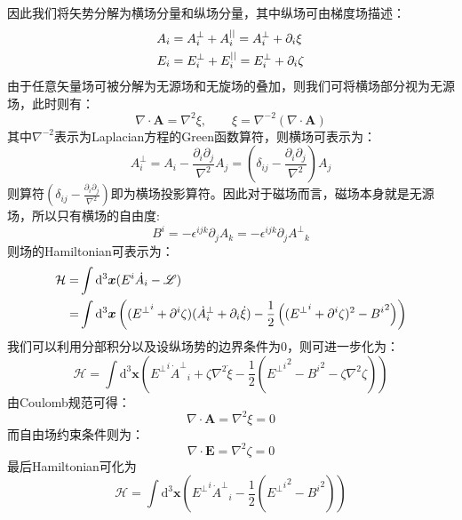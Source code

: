 \par 因此我们将矢势分解为横场分量和纵场分量，其中纵场可由梯度场描述：
\begin{align}
A_i&=A^{\bot}_i+A^{||}_i=A^{\bot}_i+\partial_i\xi\notag\\
E_i&=E^{\bot}_i+E^{||}_i=E^{\bot}_i+\partial_i\zeta
\end{align}
由于任意矢量场可被分解为无源场和无旋场的叠加，则我们可将横场部分视为无源场，此时则有：
\begin{equation}
\nabla\cdot\boldsymbol{A}=\nabla^2\xi,\qquad\xi=\nabla^{-2}(\nabla\cdot\boldsymbol{A})
\end{equation}
其中$\nabla^{-2}$表示为Laplacian方程的Green函数算符，则横场可表示为：
\begin{equation}
A^{\bot}_i=A_i-\frac{\partial_i\partial_j}{\nabla^2}A_j=(\delta_{ij}-\frac{\partial_i\partial_j}{\nabla^2})A_j
\end{equation}
则算符$(\delta_{ij}-\frac{\partial_i\partial_j}{\nabla^2})$即为横场投影算符。因此对于磁场而言，磁场本身就是无源场，所以只有横场的自由度:
\begin{equation}
B^i=-\epsilon^{ijk}\partial_j A_k=-\epsilon^{ijk}\partial_j {A^{\bot}}_k
\end{equation}
则场的Hamiltonian可表示为：
\begin{align}
\mathcal{H}=&\int\mathrm{d}^3\boldsymbol{x}(E^i \dot{A_i}-\mathscr{L})\notag\\
=&\int\mathrm{d}^3\boldsymbol{x}\left(({E^{\bot}}^i+\partial^i\zeta)({\dot{A}^{\bot}}_i+\partial_i\dot{\xi})-\frac{1}{2}\left(({E^{\bot}}^i+\partial^i\zeta)^2-{B^i}^2\right)\right)
\end{align}
我们可以利用分部积分以及设纵场势的边界条件为0，则可进一步化为：
\begin{equation}
\mathcal{H}=\int\mathrm{d}^3\boldsymbol{x}\left({E^{\bot}}^i{\dot{A}^{\bot}}_i+\zeta\nabla^2\dot{\xi}-\frac{1}{2}({{E^{\bot}}^i}^2-{B^i}^2-\zeta\nabla^2\zeta)\right)
\end{equation}
由Coulomb规范可得：
\begin{equation}
\nabla\cdot\boldsymbol{A}=\nabla^2\xi=0
\end{equation}
而自由场约束条件则为：
\begin{equation}
\nabla\cdot\boldsymbol{E}=\nabla^2\zeta=0
\end{equation}
最后Hamiltonian可化为
\begin{equation}
\mathcal{H}=\int\mathrm{d}^3\boldsymbol{x}\left({E^{\bot}}^i{\dot{A}^{\bot}}_i-\frac{1}{2}({{E^{\bot}}^i}^2-{B^i}^2)\right)
\end{equation}
